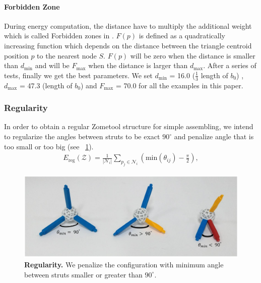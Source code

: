 \paragraph{Forbidden Zone}
During energy computation, the distance have to multiply the additional weight which is called Forbidden zones in \cite{zimmer:2014:Zometool}. 
$F(p)$ is defined as a quadratically increasing function which depends on the distance between the triangle centroid position $p$ to the nearest node $S$. $F(p)$ will be zero when the distance is smaller than $d_{\text{min}}$ and will be $F_{\text{max}}$ when the distance is larger than $d_{\text{max}}$. 
After a series of tests, finally we get the best parameters. 
We set $d_{\text{min}}$ = 16.0 ($\frac{1}{3}$ length of $b_0$) , $d_{\text{max}}$ = 47.3 (length of $b_0$) and $F_{\text{max}}$ = 70.0 for all the examples in this paper. 


\subsubsection{Regularity}
In order to obtain a regular Zometool structure for simple assembling, we intend to regularize the angles between struts to be exact $90^\circ$ and penalize angle that is too small or too big (see \figname~\ref{fig:Regularity}).
\begin{align}
E_{\text{reg}}(\mathcal{Z}) = \frac{1}{|\mathcal{N}_i|} \sum_{p_j\in\mathcal{N}_i} (\text{min}(\theta_{ij})-\frac{\pi}{2}),
\end{align}

\begin{figure}[ht]
\centering
\includegraphics[width=1.0\linewidth]{figs/Regularity.pdf} 
\caption{\textbf{Regularity.} We penalize the configuration with minimum angle between struts smaller or greater than $90^\circ$.}
\label{fig:Regularity}
\end{figure}

